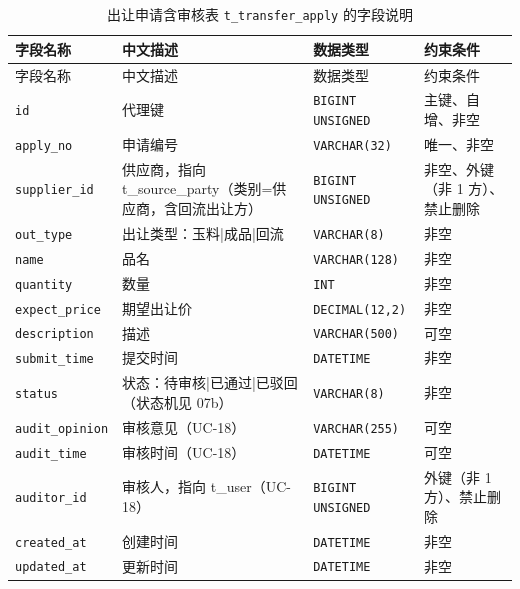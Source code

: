 \documentclass[12pt, a4paper]{ctexart}
\newcommand{\code}[1]{\texttt{\small #1}}
\begin{document}
\begin{longtable}{@{}p{3.1cm} p{4.5cm} p{2.4cm} p{4.5cm}@{}}
\caption{出让申请含审核表 \code{t\_transfer\_apply} 的字段说明}\label{tab:f-t-transfer-apply}\\
\toprule
字段名称 & 中文描述 & 数据类型 & 约束条件 \\
\midrule
\endfirsthead
\toprule
字段名称 & 中文描述 & 数据类型 & 约束条件 \\
\midrule
\endhead
\bottomrule
\endlastfoot
\code{id} & 代理键 & \code{BIGINT UNSIGNED} & 主键、自增、非空 \\
\code{apply\_no} & 申请编号 & \code{VARCHAR(32)} & 唯一、非空 \\
\code{supplier\_id} & 供应商，指向 t\_source\_party（类别=供应商，含回流出让方） & \code{BIGINT UNSIGNED} & 非空、外键（非 1 方）、禁止删除 \\
\code{out\_type} & 出让类型：玉料|成品|回流 & \code{VARCHAR(8)} & 非空 \\
\code{name} & 品名 & \code{VARCHAR(128)} & 非空 \\
\code{quantity} & 数量 & \code{INT} & 非空 \\
\code{expect\_price} & 期望出让价 & \code{DECIMAL(12,2)} & 非空 \\
\code{description} & 描述 & \code{VARCHAR(500)} & 可空 \\
\code{submit\_time} & 提交时间 & \code{DATETIME} & 非空 \\
\code{status} & 状态：待审核|已通过|已驳回（状态机见 07b） & \code{VARCHAR(8)} & 非空 \\
\code{audit\_opinion} & 审核意见（UC-18） & \code{VARCHAR(255)} & 可空 \\
\code{audit\_time} & 审核时间（UC-18） & \code{DATETIME} & 可空 \\
\code{auditor\_id} & 审核人，指向 t\_user（UC-18） & \code{BIGINT UNSIGNED} & 外键（非 1 方）、禁止删除 \\
\code{created\_at} & 创建时间 & \code{DATETIME} & 非空 \\
\code{updated\_at} & 更新时间 & \code{DATETIME} & 非空 \\
\end{longtable}
\end{document}
